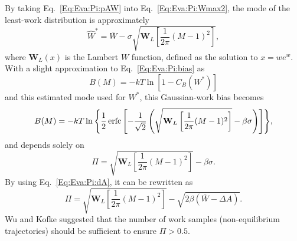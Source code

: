 By taking Eq.~\ref{Eq:Eva:Pi:pAW} into Eq.~\ref{Eq:Eva:Pi:Wmax2}, the mode of the least-work distribution is approximately
\begin{equation}
    \hat{W}^\ast=\bar{W}-\sigma\sqrt{\mathbf{W}_L\left[\frac{1}{2\pi}(M-1)^2\right]},
\end{equation}
where $\mathbf{W}_L(x)$ is the Lambert $W$ function, defined as the solution to $x=we^w$. With a slight approximation to Eq.~\ref{Eq:Eva:Pi:bias} as
\begin{equation}
    B(M)=-kT\ln{[1-C_B(W^\ast)]}
\end{equation}
and this estimated mode used for $W^\ast$, this Gaussian-work bias becomes
\begin{equation}
    B(M)=-kT\ln{\left\{\frac{1}{2}\operatorname{erfc}\left[-\frac{1}{\sqrt{2}}\left(\sqrt{\mathbf{W}_L\left[\frac{1}{2\pi}(M-1)^2\right]}-\beta\sigma\right)\right]\right\}},
\end{equation}
and depends solely on
\begin{equation}
    \Pi=\sqrt{\mathbf{W}_L\left[\frac{1}{2\pi}(M-1)^2\right]}-\beta\sigma.
\end{equation}
By using Eq.~\ref{Eq:Eva:Pi:dA}, it can be rewritten as
\begin{equation}
\Pi=\sqrt{\mathbf{W}_L\left[\frac{1}{2\pi}(M-1)^2\right]}-\sqrt{2\beta(\bar{W}-\Delta A)}.
\end{equation}
Wu and Kofke suggested that the number of work samples (non-equilibrium trajectories) should be sufficient to ensure $\Pi>0.5$.\cite{WuJCP2004}

